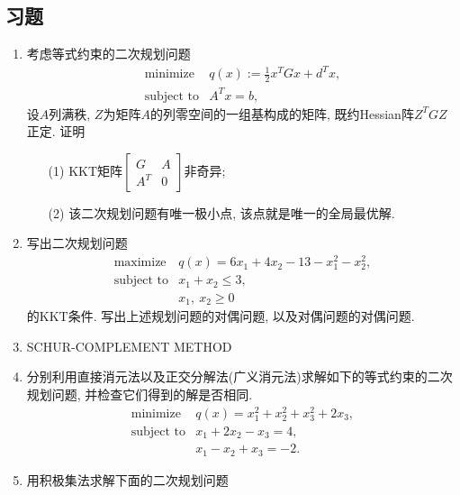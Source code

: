 \subsection*{习题}

\begin{enumerate}
\item 考虑等式约束的二次规划问题
\begin{equation*}
\begin{array}{cl}
\text{minimize} & q(x) := \frac{1}{2} x^T G x + d^T x, \\
\text{subject to} & A^T x = b,
\end{array}
\end{equation*}
设$A$列满秩, $Z$为矩阵$A$的列零空间的一组基构成的矩阵, 既约Hessian阵$Z^T G Z$正定. 证明
\begin{itemize}
    \item[(1)] KKT矩阵$\begin{bmatrix} G & A \\ A^T & 0 \end{bmatrix}$非奇异;
    \item[(2)] 该二次规划问题有唯一极小点, 该点就是唯一的全局最优解.
\end{itemize}

\item 写出二次规划问题
\begin{equation*}
\begin{array}{cl}
\text{maximize} & q(x) = 6x_1 + 4x_2 - 13 - x_1^2 - x_2^2, \\
\text{subject to} & x_1 + x_2 \leqslant 3, \\
& x_1, ~ x_2 \geqslant 0
\end{array}
\end{equation*}
的KKT条件. 写出上述规划问题的对偶问题, 以及对偶问题的对偶问题.

\item SCHUR-COMPLEMENT METHOD

\item 分别利用直接消元法以及正交分解法(广义消元法)求解如下的等式约束的二次规划问题, 并检查它们得到的解是否相同.
\begin{equation*}
\begin{array}{cl}
\text{minimize} & q(x) = x_1^2 + x_2^2 + x_3^2 + 2x_3, \\
\text{subject to} & x_1 + 2x_2 - x_3 = 4, \\
& x_1 - x_2 + x_3 = -2.
\end{array}
\end{equation*}

\item 用积极集法求解下面的二次规划问题
\end{enumerate}
